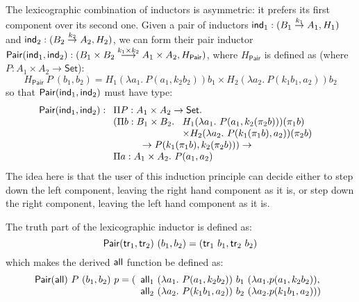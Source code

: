 \documentclass{article}
\newcommand{\Set}{\mathsf{Set}}
\begin{document}
The lexicographic combination of inductors is asymmetric: it prefers
its first component over its second one. Given a pair of inductors
$\mathsf{ind}_1 : (B_1 \stackrel{k_1}\to A_1, H_1)$ and $\mathsf{ind}_2 : (B_2
\stackrel{k_2}\to A_2, H_2)$, we can form their pair inductor
$\mathsf{Pair}(\mathsf{ind}_1, \mathsf{ind}_2) : (B_1 \times B_2 \stackrel{k_1 \times
  k_2}\longrightarrow A_1 \times A_2, H_{\mathsf{Pair}})$, where
$H_{\mathsf{Pair}}$ is defined as (where $P : A_1 \times A_2 \to
\Set$):
\begin{displaymath}
  H_{\mathsf{Pair}}\ P\ (b_1,b_2) = H_1(\lambda a_1.\ P(a_1,k_2b_2))b_1 \times H_2(\lambda a_2.\ P(k_1b_1,a_2))b_2
\end{displaymath}
so that $\mathsf{Pair}(\mathsf{ind}_1, \mathsf{ind}_2)$ must have type:
\begin{displaymath}
  \mathsf{Pair}(\ind_1, \ind_2) :
  \begin{array}[t]{l}
    \Pi P : A_1 \times A_2 \to \Set. \\
        (\Pi b : B_1 \times B_2.\
    \begin{array}[t]{l}
      H_1(\lambda a_1.\ P(a_1, k_2(\pi_2 b)))(\pi_1 b) \\
      \times H_2(\lambda a_2.\ P(k_1(\pi_1b), a_2))(\pi_2 b)
    \end{array} \\
    \quad\quad\quad\to P (k_1 (\pi_1 b), k_2 (\pi_2 b))) \to \\
    \Pi a : A_1 \times A_2.\ P (a_1, a_2)
  \end{array}
\end{displaymath}
The idea here is that the user of this induction principle can decide
either to step down the left component, leaving the right hand
component as it is, or step down the right component, leaving the left
hand component as it is.

The truth part of the lexicographic inductor is defined as:
\begin{displaymath}
  \mathsf{Pair}(\mathsf{tr}_1, \mathsf{tr}_2)\ (b_1, b_2) = (\mathsf{tr}_1\ b_1 , \mathsf{tr}_2\ b_2)
\end{displaymath}
which makes the derived $\mathsf{all}$ function be defined as:
\begin{displaymath}
  \mathsf{Pair}(\mathsf{all})\ P\ (b_1,b_2)\ p = (
  \begin{array}[t]{l}
    \mathsf{all}_1\ (\lambda a_1.\ P(a_1,k_2b_2))\ b_1\ (\lambda a_1. p (a_1,k_2b_2)), \\
    \mathsf{all}_2\ (\lambda a_2.\ P(k_1b_1,a_2))\ b_2\ (\lambda a_2. p (k_1b_1,a_2)))
  \end{array}
\end{displaymath}
\end{document}
